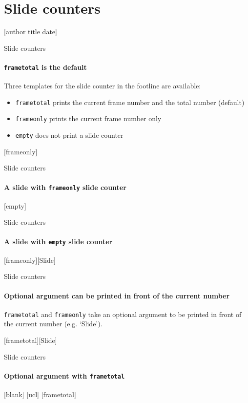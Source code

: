 \documentclass[aspectratio=169]{beamer}
\begin{document}

\section{Slide counters}

[author title date]

\begin{frame}{Slide counters}
  \framesubtitle{\texttt{frametotal} is the default}
  Three templates for the slide counter in the footline are available:
  \begin{itemize}
    \item \texttt{frametotal} prints the current frame number and the total number (default)
    \item \texttt{frameonly} prints the current frame number only
    \item \texttt{empty} does not print a slide counter
  \end{itemize}
\end{frame}

[frameonly]
\begin{frame}{Slide counters}
  \framesubtitle{A slide with \texttt{frameonly} slide counter}
\end{frame}

[empty]
\begin{frame}{Slide counters}
  \framesubtitle{A slide with \texttt{empty} slide counter}
\end{frame}

[frameonly][Slide]
\begin{frame}{Slide counters}
  \framesubtitle{Optional argument can be printed in front of the current number}
  \texttt{frametotal} and \texttt{frameonly} take an optional argument
  to be printed in front of the current number (e.g. `Slide').
\end{frame}

[frametotal][Slide]
\begin{frame}{Slide counters}
  \framesubtitle{Optional argument with \texttt{frametotal}}
\end{frame}

[blank]
[ucl]
[frametotal]

\end{document}
